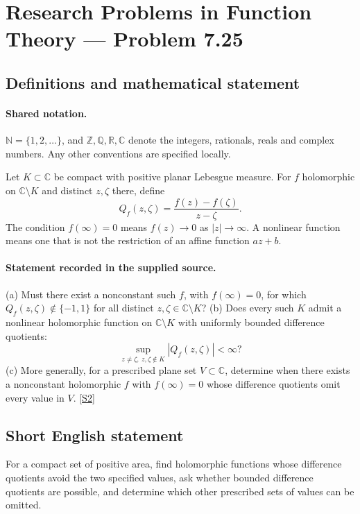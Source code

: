 \documentclass[11pt]{article}
\newcommand{\sref}[2]{\hyperlink{source:#1:#2}{[S#2]}}
\begin{document}
\section{Research Problems in Function Theory — Problem 7.25}\label{statement}

\subsection{Definitions and mathematical statement}

\paragraph{Shared notation.}$\mathbb N=\{1,2,\ldots\}$, and $\mathbb Z,\mathbb Q,\mathbb R,\mathbb C$ denote the integers, rationals, reals and complex numbers. Any other conventions are specified locally.


Let $K\subset\mathbb C$ be compact with positive planar Lebesgue measure. For $f$ holomorphic on $\mathbb C\setminus K$ and distinct $z,\zeta$ there, define
\[Q_f(z,\zeta)=\frac{f(z)-f(\zeta)}{z-\zeta}.\]
The condition $f(\infty)=0$ means $f(z)\to0$ as $|z|\to\infty$. A nonlinear function means one that is not the restriction of an affine function $az+b$.

\paragraph{Statement recorded in the supplied source.}
(a) Must there exist a nonconstant such $f$, with $f(\infty)=0$, for which $Q_f(z,\zeta)\notin\{-1,1\}$ for all distinct $z,\zeta\in\mathbb C\setminus K$?
(b) Does every such $K$ admit a nonlinear holomorphic function on $\mathbb C\setminus K$ with uniformly bounded difference quotients:
\[\sup_{z\ne\zeta,\ z,\zeta\notin K}|Q_f(z,\zeta)|<\infty?\]
(c) More generally, for a prescribed plane set $V\subset\mathbb C$, determine when there exists a nonconstant holomorphic $f$ with $f(\infty)=0$ whose difference quotients omit every value in $V$. \sref{statement}{2}

\subsection{Short English statement}
For a compact set of positive area, find holomorphic functions whose difference quotients avoid the two specified values, ask whether bounded difference quotients are possible, and determine which other prescribed sets of values can be omitted.
\end{document}
